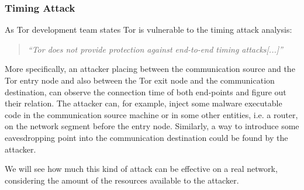 \subsubsection{Timing Attack}
As Tor development team states Tor is vulnerable to the timing attack analysis:
\begin{quote}
\emph{``Tor does not provide protection against end-to-end timing attacks[...]''}
\end{quote}
More specifically, an attacker placing between the communication source and the Tor entry 
node and also between the Tor exit node and the communication destination, 
can observe the connection time of both end-points and figure out their relation.
The attacker can, for example, inject some malware executable code in the communication 
source machine or in some
other entities, i.e. a router, on the network segment before the entry node. 
Similarly, a way to introduce some eavesdropping point into the communication destination 
could be found by the attacker.

We will see how much this kind of attack can be effective on a real network, 
considering the amount of the resources available to the attacker.

